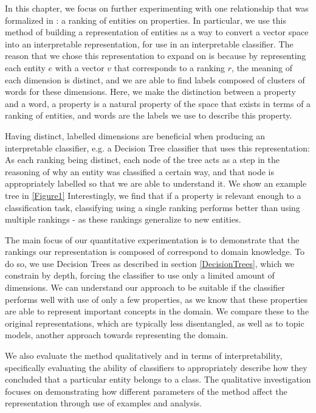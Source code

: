 \documentclass{article}
\begin{document}
In this chapter, we focus on further experimenting with one relationship that was formalized in \cite{Derrac2015}: a ranking of entities on properties. In particular, we use this method of building a representation of entities as a way to convert a vector space into an interpretable representation, for use in an interpretable classifier. The reason that we chose this representation to expand on is because by representing each entity $e$ with a vector $v$ that corresponds to a ranking $r$, the meaning of each dimension is distinct, and we are able to find labels composed of clusters of words for these dimensions. Here, we make the distinction between a property and a word, a property is a natural property of the space that exists in terms of a ranking of entities, and words are the labels we use to describe this property.

Having distinct, labelled dimensions are beneficial when producing an interpretable classifier, e.g. a Decision Tree classifier that uses this representation: As each ranking being distinct, each node of the tree acts as a step in the reasoning of why an entity was classified a certain way, and that node is appropriately labelled so that we are able to understand it. We show an example tree in \ref{Figure1} Interestingly, we find that if a property is relevant enough to a classification task, classifying using a single ranking performs better than using multiple rankings - as these rankings generalize to new entities.  %

The main focus of our quantitative experimentation is to demonstrate that the rankings our representation is composed of correspond to domain knowledge. To do so, we use Decision Trees as described in section \ref{DecisionTrees}, which we constrain by depth, forcing the classifier to use only a limited amount of dimensions. We can understand our approach to be suitable if the classifier performs well with use of only a few properties, as we know that these properties are able to represent important concepts in the domain. We compare these to the original representations, which are typically less disentangled, as well as to topic models, another approach towards representing the domain. 

We also evaluate the method qualitatively and in terms of interpretability, specifically evaluating the ability of classifiers to appropriately describe how they concluded that a particular entity belongs to a class. The qualitative investigation focuses on demonstrating how different parameters of the method affect the representation through use of examples and analysis.
\end{document}
